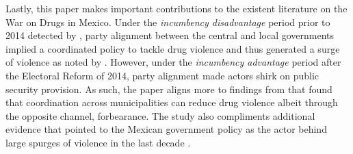 \documentclass[12pt]{amsart}
\numberwithin{equation}{section}
\theoremstyle{definition}
\theoremstyle{definition}
\theoremstyle{definition}
\begin{document}

Lastly, this paper makes important contributions to the existent literature on the War on Drugs in Mexico. Under the \emph{incumbency disadvantage} period prior to 2014 detected by \citet{klasnja_titiunik_2017}, party alignment between the central and local governments implied a coordinated policy to tackle drug violence and thus generated a surge of violence as noted by \citet{dell_2015}. However, under the \emph{incumbency advantage} period after the Electoral Reform of 2014, party alignment made actors shirk on public security provision. As such, the paper aligns more to findings from \citet{durante_gutierrez_2013} that found that coordination across municipalities can reduce drug violence albeit through the opposite channel, forbearance. The study also compliments additional evidence that pointed to the Mexican government policy as the actor behind large spurges of violence in the last decade \citep{escalante_2011, guerrero_2011}%
. %


 
\end{document}
